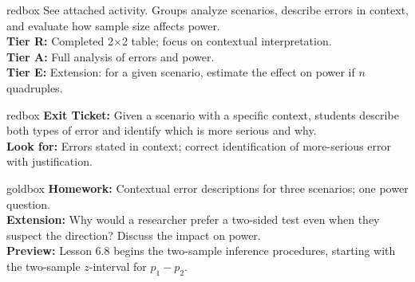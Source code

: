 \documentclass[10pt]{article}
\begin{document}
\begin{skillbox}{redbox}
    See attached activity. Groups analyze scenarios, describe errors in context, and evaluate
    how sample size affects power.\\[4pt]
    \textbf{Tier R:} Completed 2×2 table; focus on contextual interpretation.\\
    \textbf{Tier A:} Full analysis of errors and power.\\
    \textbf{Tier E:} Extension: for a given scenario, estimate the effect on power if $n$ quadruples.
\end{skillbox}

\begin{skillbox}{redbox}
    \textbf{Exit Ticket:} Given a scenario with a specific context, students describe both types of
    error and identify which is more serious and why.\\[4pt]
    \textbf{Look for:} Errors stated in context; correct identification of more-serious error with justification.
\end{skillbox}

\begin{skillbox}{goldbox}
    \textbf{Homework:} Contextual error descriptions for three scenarios; one power question.\\[4pt]
    \textbf{Extension:} Why would a researcher prefer a two-sided test even when they suspect
    the direction? Discuss the impact on power. \\[4pt]
    \textbf{Preview:} Lesson 6.8 begins the two-sample inference procedures, starting with the
    two-sample $z$-interval for $p_1 - p_2$.
\end{skillbox}
\end{document}
